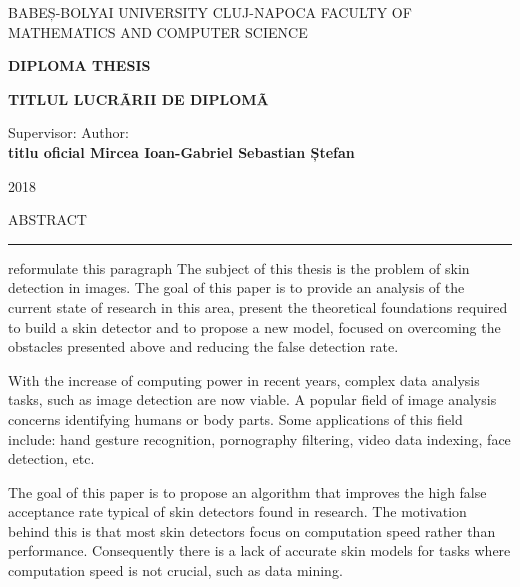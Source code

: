 \documentclass[12pt]{report}
\begin{document}
	
	\begin{titlepage}
		
		\begin{center}
			\Large{{BABEȘ-BOLYAI UNIVERSITY CLUJ-NAPOCA}}
			\newline
			\Large{{FACULTY OF MATHEMATICS AND COMPUTER SCIENCE}}
			
			\vspace{8cm}
			
			\textbf{DIPLOMA THESIS}
			
			\vspace{1cm}
			\Huge\textbf{{TITLUL LUCRÃRII DE DIPLOMÃ}}
			\fontsize{12}{14}
			
		\end{center}
		\vspace{6cm}
		
		\hspace*{0.8cm}Supervisor: \hfill  Author: \hspace*{0.8cm} \\    
		\textbf{titlu oficial Mircea Ioan-Gabriel \hfill  \textbf{Sebastian Ștefan}}
		
		\vspace{2cm}
		\begin{center}
			\Large{2018}
		\end{center}
	\end{titlepage}


	\cleardoublepage
	ABSTRACT
	\vspace{0.5cm}	
	\hrule
	\vspace{0.5cm}	
	
	 reformulate this paragraph
	The subject of this thesis is the problem of skin detection in images. The goal of this paper is to provide an analysis of the current state of research in this area, present the theoretical foundations required to build a skin detector and to propose a new model, focused on overcoming the obstacles presented above and reducing the false detection rate.
	
	With the increase of computing power in recent years, complex data analysis tasks, such as image detection are now viable. A popular field of image analysis concerns identifying humans or body parts.  Some applications of this field include: hand gesture recognition, pornography filtering, video data indexing, face detection, etc. 
	
	The goal of this paper is to propose an algorithm that improves the high false acceptance rate typical of skin detectors found in research. The motivation behind this is that most skin detectors focus on computation speed rather than performance. Consequently there is a lack of accurate skin models for tasks where computation speed is not crucial, such as data mining.
	
\end{document}
